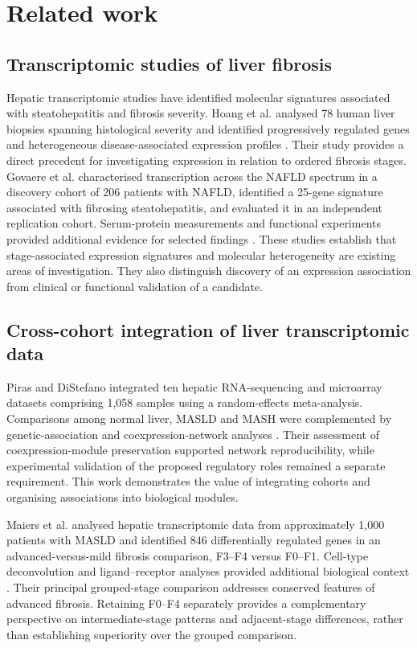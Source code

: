 \documentclass[11pt,a4paper]{article}
\begin{document}
\section*{Related work}
\subsection*{Transcriptomic studies of liver fibrosis}
Hepatic transcriptomic studies have identified molecular signatures associated with steatohepatitis and fibrosis severity. Hoang et al. analysed 78 human liver biopsies spanning histological severity and identified progressively regulated genes and heterogeneous disease-associated expression profiles \cite{ref4}. Their study provides a direct precedent for investigating expression in relation to ordered fibrosis stages. Govaere et al. characterised transcription across the NAFLD spectrum in a discovery cohort of 206 patients with NAFLD, identified a 25-gene signature associated with fibrosing steatohepatitis, and evaluated it in an independent replication cohort. Serum-protein measurements and functional experiments provided additional evidence for selected findings \cite{govaere2020}. These studies establish that stage-associated expression signatures and molecular heterogeneity are existing areas of investigation. They also distinguish discovery of an expression association from clinical or functional validation of a candidate.

\subsection*{Cross-cohort integration of liver transcriptomic data}
Piras and DiStefano integrated ten hepatic RNA-sequencing and microarray datasets comprising 1,058 samples using a random-effects meta-analysis. Comparisons among normal liver, MASLD and MASH were complemented by genetic-association and coexpression-network analyses \cite{piras2024}. Their assessment of coexpression-module preservation supported network reproducibility, while experimental validation of the proposed regulatory roles remained a separate requirement. This work demonstrates the value of integrating cohorts and organising associations into biological modules.

Maiers et al. analysed hepatic transcriptomic data from approximately 1,000 patients with MASLD and identified 846 differentially regulated genes in an advanced-versus-mild fibrosis comparison, F3--F4 versus F0--F1. Cell-type deconvolution and ligand--receptor analyses provided additional biological context \cite{maiers2026}. Their principal grouped-stage comparison addresses conserved features of advanced fibrosis. Retaining F0--F4 separately provides a complementary perspective on intermediate-stage patterns and adjacent-stage differences, rather than establishing superiority over the grouped comparison.
\end{document}
